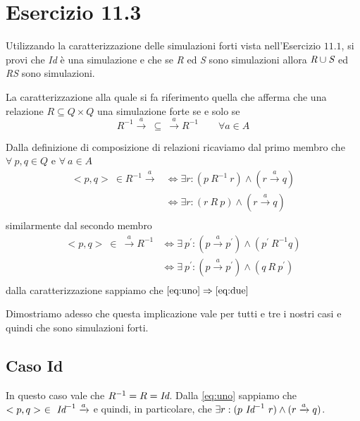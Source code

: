 		\newpage
		
	\section{Esercizio 11.3}
		Utilizzando la caratterizzazione delle simulazioni forti vista
		nell'Esercizio $11.1$, si provi che \emph{Id} \`e una simulazione e che se
		\emph{R} ed \emph{S} sono simulazioni allora $\emph{R} \cup \emph{S}$ ed
		\emph{RS} sono simulazioni.
		
		\sectionline
		La caratterizzazione alla quale si fa riferimento \eacc quella che afferma che una relazione $R \subseteq Q \times Q$ \eacc una simulazione forte se e solo se $$R^{-1} \xrightarrow{a} \ \subseteq \ \xrightarrow{a}R^{-1} \qquad \forall a \in A$$
		
		Dalla definizione di composizione di relazioni ricaviamo dal primo membro che $\forall \ p,q \in Q$ e $\forall \ a \in A$
		\begin{equation}
		\label{eq:uno}
		\begin{aligned}
		<p,q>\ \in R^{-1}\xrightarrow{a} & \Leftrightarrow \exists r: (p \ R^{-1} \ r) \land (r \xrightarrow{a} q)\\
		& \Leftrightarrow \exists r: (r \ R \ p) \land (r \xrightarrow{a} q)\\
		\end{aligned}
		\end{equation}
		similarmente dal secondo membro
		\begin{equation}
		\label{eq:due}
		\begin{aligned}
		<p,q>\ \in \ \xrightarrow{a} R^{-1} & \Leftrightarrow \exists \ p^{'}: (p \xrightarrow{a} p^{'}) \land (p^{'} \ R^{-1} q)\\
		& \Leftrightarrow \exists \ p^{'}: (p \xrightarrow{a} p^{'}) \land (q \ R \ p^{'})\\
		\end{aligned}
		\end{equation}
		dalla caratterizzazione sappiamo che $\eqref{eq:uno} \Rightarrow \eqref{eq:due}$
		
		Dimostriamo adesso che questa implicazione vale per tutti e tre i nostri casi e quindi che sono simulazioni forti.
		
		\subsection{Caso Id}
		
		In questo caso vale che $R^{-1} = R = \emph{Id}$. Dalla \eqref{eq:uno} sappiamo che $<p,q>\ \in \ \emph{Id}^{-1} \xrightarrow{a}$ e quindi, in particolare, che $\exists r: (p \ \emph{Id}^{-1} \ r) \land (r \xrightarrow{a} q)$.
		
